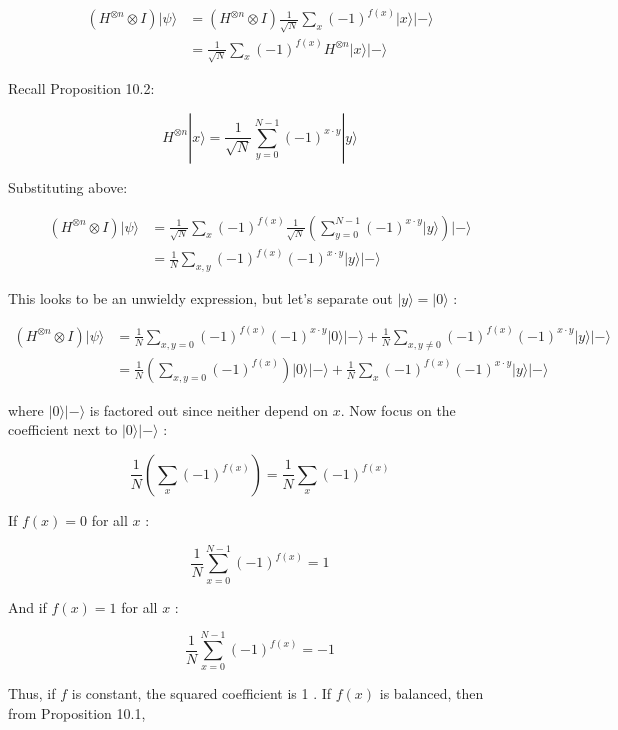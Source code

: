 \documentclass[main.tex]{subfiles}
\begin{document}
    $$
    \begin{aligned}
    \left(H^{\otimes n} \otimes I\right)|\psi\rangle &=\left(H^{\otimes n} \otimes I\right) \frac{1}{\sqrt{N}} \sum_{x}(-1)^{f(x)}|x\rangle|-\rangle \\
    &=\frac{1}{\sqrt{N}} \sum_{x}(-1)^{f(x)} H^{\otimes n}|x\rangle|-\rangle
    \end{aligned}
    $$
    
    Recall Proposition 10.2:
    
    $$
    H^{\otimes n}|x\rangle=\frac{1}{\sqrt{N}} \sum_{y=0}^{N-1}(-1)^{x \cdot y}|y\rangle
    $$
    
    Substituting above:
    
    $$
    \begin{aligned}
    \left(H^{\otimes n} \otimes I\right)|\psi\rangle &=\frac{1}{\sqrt{N}} \sum_{x}(-1)^{f(x)} \frac{1}{\sqrt{N}}\left(\sum_{y=0}^{N-1}(-1)^{x \cdot y}|y\rangle\right)|-\rangle \\
    &=\frac{1}{N} \sum_{x, y}(-1)^{f(x)}(-1)^{x \cdot y}|y\rangle|-\rangle
    \end{aligned}
    $$
    
    This looks to be an unwieldy expression, but let's separate out $|y\rangle=|0\rangle$ :
    
    $$
    \begin{aligned}
    \left(H^{\otimes n} \otimes I\right)|\psi\rangle &=\frac{1}{N} \sum_{x, y=0}(-1)^{f(x)}(-1)^{x \cdot y}|0\rangle|-\rangle+\frac{1}{N} \sum_{x, y \neq 0}(-1)^{f(x)}(-1)^{x \cdot y}|y\rangle|-\rangle \\
    &=\frac{1}{N}\left(\sum_{x, y=0}(-1)^{f(x)}\right)|0\rangle|-\rangle+\frac{1}{N} \sum_{x}(-1)^{f(x)}(-1)^{x \cdot y}|y\rangle|-\rangle
    \end{aligned}
    $$
    
    where $|0\rangle|-\rangle$ is factored out since neither depend on $x$. Now focus on the coefficient next to $|0\rangle|-\rangle$ :
    
    $$
    \frac{1}{N}\left(\sum_{x}(-1)^{f(x)}\right)=\frac{1}{N} \sum_{x}(-1)^{f(x)}
    $$
    
    If $f(x)=0$ for all $x$ :
    
    $$
    \frac{1}{N} \sum_{x=0}^{N-1}(-1)^{f(x)}=1
    $$
    
    And if $f(x)=1$ for all $x$ :
    
    $$
    \frac{1}{N} \sum_{x=0}^{N-1}(-1)^{f(x)}=-1
    $$
    
    Thus, if $f$ is constant, the squared coefficient is 1 . If $f(x)$ is balanced, then from Proposition 10.1,
    
\end{document}
